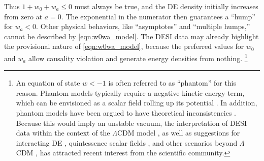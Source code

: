 \documentclass[a4paper,11pt]{article}
\begin{document}
Thus $1 + w_0 + w_a \leqslant 0$ must always be true, and the DE density initially increases from zero at $a = 0$.
The exponential in the numerator then guarantees a ``hump'' for $w_a < 0$.
Other physical behaviors, like ``asymptotes'' and ``multiple humps,'' cannot be described by \cref{eqn:w0wa_model}.
The DESI data may already highlight the provisional nature of \cref{eqn:w0wa_model}, because the preferred values for $w_0$ and $w_a$ allow causality violation and generate energy densities from nothing.%
\footnote{An equation of state $w < -1$ is often referred to as ``phantom'' for this reason.
Phantom models typically require a negative kinetic energy term, which can be envisioned as a scalar field rolling up its potential \cite{Caldwell:1999ew}. 
In addition, phantom models have been argued to have theoretical inconsistencies \cite{Carroll:2003st, Caldwell:2003vq,Nojiri:2005sx, Fang:2008sn}.  
Because this would imply an unstable vacuum, the interpretation of DESI data within the context of the $\Lambda$CDM model \cite{Colgain:2024xqj, Cortes:2024lgw,Carloni:2024zpl, Wang:2024rjd, Calderon:2024uwn, Park:2024jns}, as well as suggestions for interacting DE \cite{Giare:2024smz}, quintessence scalar fields \cite{Berghaus:2024kra,Tada:2024znt, Yang:2024kdo}, and other scenarios beyond $\Lambda$CDM \cite{Wang:2024hks, Yin:2024hba}, has attracted recent interest from the scientific community.}
\end{document}
